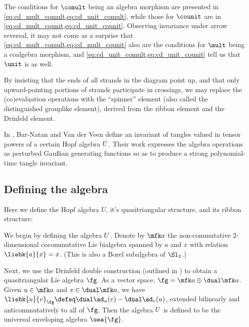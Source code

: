 \documentclass{article}
\begin{document}
\begin{remark}
        The conditions for $\comult$ being an algebra morphism are presented in
        \cref{eq:cd_mult_comult,eq:cd_unit_comult}, while those for $\counit$
        are in \cref{eq:cd_mult_counit,eq:cd_unit_counit}. Observing invariance
        under arrow reversal, it may not come as a surprise that
        \cref{eq:cd_mult_comult,eq:cd_mult_counit} also are the conditions for
        $\mult$ being a coalgebra morphism, and
        \cref{eq:cd_unit_comult,eq:cd_unit_counit} tell us that $\unit$ is as
        well.
\end{remark}


\begin{remark}
        By insisting that the ends of all strands in the diagram point up, and
        that only upward-pointing portions of strands participate in crossings,
        we may replace the (co)evaluation operations with the \enquote{spinner}
        element (also called the distinguished grouplike element), derived from
        the ribbon element and the Drinfeld element.
\end{remark}
In \cite{BV}, Bar-Natan and Van der Veen define an invariant of tangles valued
in tensor powers of a certain Hopf algebra $U$. Their work expresses the
algebra operations as perturbed Gaußian generating functions so as to produce a
strong polynomial-time tangle invariant.

\subsection{Defining the algebra}
Here we define the Hopf algebra $U$, it's quasitriangular structure, and its
ribbon structure:

We begin by defining the algebra $U$. Denote by $\fa$ the non-commutative
$2$-dimensional cocommutative Lie bialgebra spanned by $a$ and $x$ with relation
$\liebk{a}{x} = x$. (This is also a Borel subalgebra of $\Sl_2$.)

Next, we use the Drinfeld double construction (outlined in \cite{ES}) to obtain
a quasitriangular Lie algebra $\fg$. As a vector space,
$\fg = \fa \oplus \dual\fa$. Given $u \in \fa$ and $v\in \dual \fa$, we have
$\liebk{u}{v}_{\fg} \defeq \dual\ad_u(v) - \dual\ad_v(u)$, extended bilinearly
and anticommutatively to all of $\fg$.
Then the algebra $U$ is defined to be the universal enveloping algebra
$\uea{\fg}$.
\end{document}
